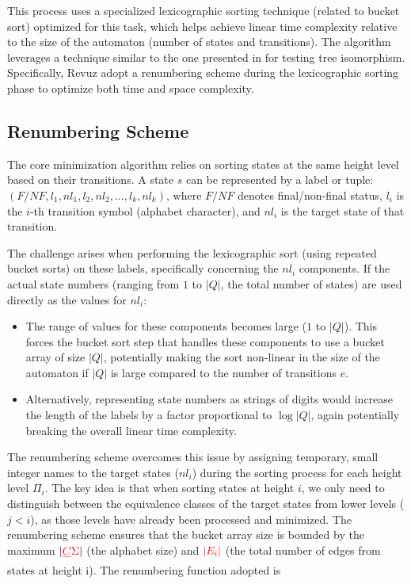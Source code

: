 This process uses a specialized lexicographic sorting technique (related to bucket sort) optimized for this task, which helps achieve linear time complexity relative to the size of the automaton (number of states and transitions). The algorithm leverages a technique similar to the one presented in \cite{aho1974design} for testing tree isomorphism. Specifically, Revuz adopt a renumbering scheme during the lexicographic sorting phase to optimize both time and space complexity. 

\subsection{Renumbering Scheme }
The core minimization algorithm relies on sorting states at the same height level based on their transitions. A state $s$ can be represented by a label or tuple: $(F/NF, l_1, nl_1, l_2, nl_2, \dots, l_k, nl_k)$, where $F/NF$ denotes final/non-final status, $l_i$ is the $i$-th transition symbol (alphabet character), and $nl_i$ is the target state of that transition.

The challenge arises when performing the lexicographic sort (using repeated bucket sorts) on these labels, specifically concerning the $nl_i$ components. If the actual state numbers (ranging from $1$ to $|Q|$, the total number of states) are used directly as the values for $nl_i$:
\begin{itemize}
    \item The range of values for these components becomes large ($1$ to $|Q|$). This forces the bucket sort step that handles these components to use a bucket array of size $|Q|$, potentially making the sort non-linear in the size of the automaton if $|Q|$ is large compared to the number of transitions $e$.
    \item Alternatively, representing state numbers as strings of digits would increase the length of the labels by a factor proportional to $\log |Q|$, again potentially breaking the overall linear time complexity.
\end{itemize}

The renumbering scheme overcomes this issue by assigning temporary, small integer names to the target states ($nl_i$) during the sorting process for each height level $\Pi_i$. The key idea is that when sorting states at height $i$, we only need to distinguish between the equivalence classes of the target states   from lower levels ($j < i$), as those levels have already been processed and minimized. The renumbering scheme ensures that the bucket array size is bounded by the maximum  $|\draft{\sout{C} \Sigma}|$ (the alphabet size) and ${\color{red}{|E_i|}}$ (the total number of edges from states at height i). The renumbering function adopted is  

